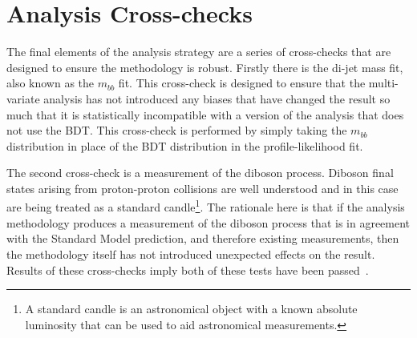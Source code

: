 \section{Analysis Cross-checks}

The final elements of the analysis strategy are a series of cross-checks that
are designed to ensure the methodology is robust. Firstly there is the di-jet
mass fit, also known as the $m_{bb}$ fit. This cross-check is designed to ensure
that the multi-variate analysis has not introduced any biases that have changed
the result so much that it is statistically incompatible with a version of the
analysis that does not use the BDT. This cross-check is performed by simply
taking the $m_{bb}$ distribution in place of the BDT distribution in the
profile-likelihood fit.

The second cross-check is a measurement of the diboson process. Diboson final
states arising from proton-proton collisions are well understood and in this
case are being treated as a standard candle\footnote{A standard candle is an
astronomical object with a known absolute luminosity that can be used to aid
astronomical measurements. }. The rationale here is that if the analysis
methodology produces a measurement of the diboson process that is in agreement
with the Standard Model prediction, and therefore existing measurements, then
the methodology itself has not introduced unexpected effects on the result.
Results of these cross-checks imply both of these tests have been
passed~\cite{VHMainNote2019}.

